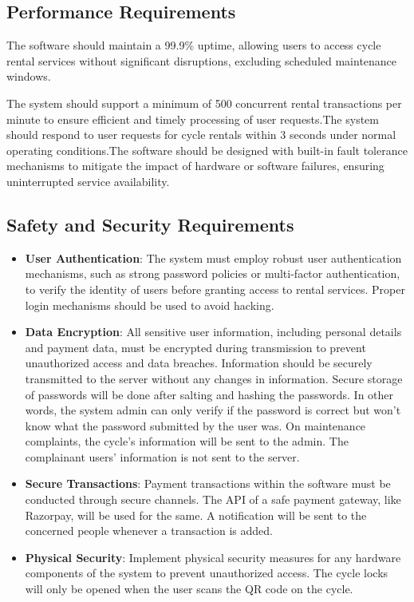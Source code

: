 \documentclass[11pt]{article}
\begin{document}
\subsection{Performance Requirements}
The software should maintain a 99.9\% uptime, allowing users to access cycle rental services without significant disruptions, excluding scheduled maintenance windows.

The system should support a minimum of 500 concurrent rental transactions per minute to ensure efficient and timely processing of user requests.The system should respond to user requests for cycle rentals within 3 seconds under normal operating conditions.The software should be designed with built-in fault tolerance mechanisms to mitigate the impact of hardware or software failures, ensuring uninterrupted service availability.

\subsection{Safety and Security Requirements}
\begin{itemize}
    \item \textbf{User Authentication}: The system must employ robust user authentication mechanisms, such as strong password policies or multi-factor authentication, to verify the identity of users before granting access to rental services. Proper login mechanisms should be used to avoid hacking.
    \item \textbf{Data Encryption}: All sensitive user information, including personal details and payment data, must be encrypted during transmission to prevent unauthorized access and data breaches. Information should be securely transmitted to the server without any changes in information. Secure storage of passwords will be done after salting and hashing the passwords. In other words, the system admin can only verify if the password is correct but won’t know what the password submitted by the user was. On maintenance complaints, the cycle’s information will be sent to the admin. The complainant users’ information is not sent to the server.
    \item \textbf{Secure Transactions}: Payment transactions within the software must be conducted through secure channels. The API of a safe payment gateway, like Razorpay, will be used for the same. A notification will be sent to the concerned people whenever a transaction is added.
    \item \textbf{Physical Security}: Implement physical security measures for any hardware components of the system to prevent unauthorized access. The cycle locks will only be opened when the user scans the QR code on the cycle.
\end{itemize}
\end{document}
